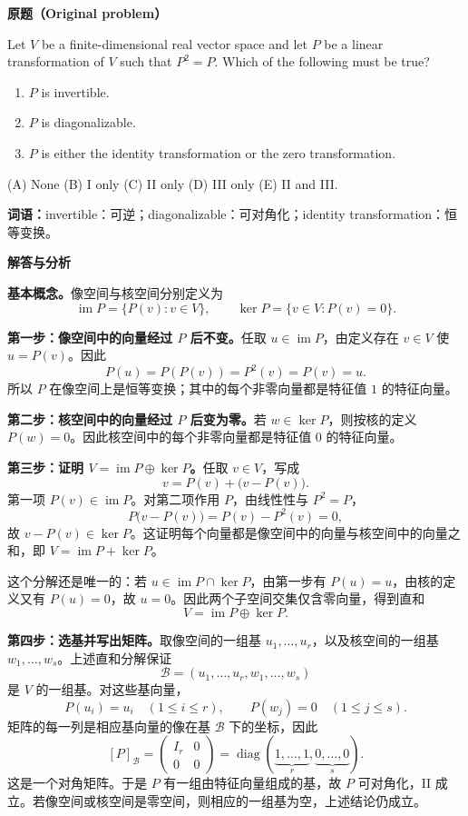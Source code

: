 \documentclass[11pt,a4paper]{ctexart}
\begin{document}
\textbf{原题（Original problem）}\par
Let $V$ be a finite-dimensional real vector space and let $P$ be a linear transformation of $V$ such that $P^2=P$. Which of the following must be true?
\begin{enumerate}[label=\Roman*.]
\item $P$ is invertible. \item $P$ is diagonalizable. \item $P$ is either the identity transformation or the zero transformation.
\end{enumerate}
(A) None \quad (B) I only \quad (C) II only \quad (D) III only \quad (E) II and III.

\textbf{词语：}invertible：可逆；diagonalizable：可对角化；identity transformation：恒等变换。

\textbf{解答与分析}\par


\textbf{基本概念。}像空间与核空间分别定义为
\[
\operatorname{im}P=\{P(v):v\in V\},\qquad
\ker P=\{v\in V:P(v)=0\}.
\]

\textbf{第一步：像空间中的向量经过 \(P\) 后不变。}任取 \(u\in\operatorname{im}P\)，由定义存在 \(v\in V\) 使 \(u=P(v)\)。因此
\[
P(u)=P(P(v))=P^2(v)=P(v)=u.
\]
所以 \(P\) 在像空间上是恒等变换；其中的每个非零向量都是特征值 \(1\) 的特征向量。

\textbf{第二步：核空间中的向量经过 \(P\) 后变为零。}若 \(w\in\ker P\)，则按核的定义 \(P(w)=0\)。因此核空间中的每个非零向量都是特征值 \(0\) 的特征向量。

\textbf{第三步：证明 \(V=\operatorname{im}P\oplus\ker P\)。}任取 \(v\in V\)，写成
\[
v=P(v)+\bigl(v-P(v)\bigr).
\]
第一项 \(P(v)\in\operatorname{im}P\)。对第二项作用 \(P\)，由线性性与 \(P^2=P\)，
\[
P\bigl(v-P(v)\bigr)=P(v)-P^2(v)=0,
\]
故 \(v-P(v)\in\ker P\)。这证明每个向量都是像空间中的向量与核空间中的向量之和，即 \(V=\operatorname{im}P+\ker P\)。

这个分解还是唯一的：若 \(u\in\operatorname{im}P\cap\ker P\)，由第一步有 \(P(u)=u\)，由核的定义又有 \(P(u)=0\)，故 \(u=0\)。因此两个子空间交集仅含零向量，得到直和
\[
V=\operatorname{im}P\oplus\ker P.
\]

\textbf{第四步：选基并写出矩阵。}取像空间的一组基 \(u_1,\ldots,u_r\)，以及核空间的一组基 \(w_1,\ldots,w_s\)。上述直和分解保证
\[
\mathcal B=(u_1,\ldots,u_r,w_1,\ldots,w_s)
\]
是 \(V\) 的一组基。对这些基向量，
\[
P(u_i)=u_i\quad(1\le i\le r),\qquad P(w_j)=0\quad(1\le j\le s).
\]
矩阵的每一列是相应基向量的像在基 \(\mathcal B\) 下的坐标，因此
\[
[P]_{\mathcal B}=
\begin{pmatrix}I_r&0\\0&0\end{pmatrix}
=\operatorname{diag}(\underbrace{1,\ldots,1}_{r},
\underbrace{0,\ldots,0}_{s}).
\]
这是一个对角矩阵。于是 \(P\) 有一组由特征向量组成的基，故 \(P\) 可对角化，II 成立。若像空间或核空间是零空间，则相应的一组基为空，上述结论仍成立。
\end{document}
